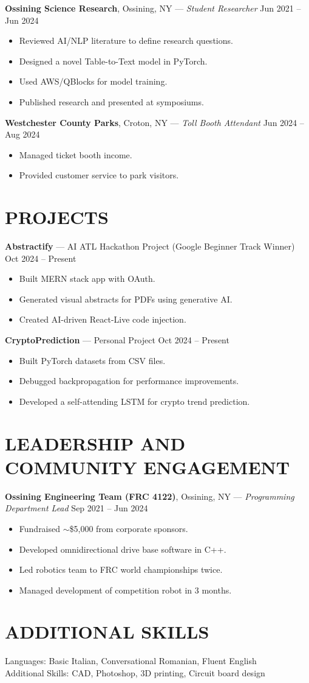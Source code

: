 \documentclass[11pt]{article}
\begin{document}
\textbf{Ossining Science Research}, Ossining, NY --- \textit{Student Researcher} \hfill Jun 2021 -- Jun 2024
\begin{itemize}
    \item Reviewed AI/NLP literature to define research questions.
    \item Designed a novel Table-to-Text model in PyTorch.
    \item Used AWS/QBlocks for model training.
    \item Published research and presented at symposiums.
\end{itemize}

\textbf{Westchester County Parks}, Croton, NY --- \textit{Toll Booth Attendant} \hfill Jun 2024 -- Aug 2024
\begin{itemize}
    \item Managed ticket booth income.
    \item Provided customer service to park visitors.
\end{itemize}

\section*{PROJECTS}
\textbf{Abstractify} --- AI ATL Hackathon Project (Google Beginner Track Winner) \hfill Oct 2024 -- Present
\begin{itemize}
    \item Built MERN stack app with OAuth.
    \item Generated visual abstracts for PDFs using generative AI.
    \item Created AI-driven React-Live code injection.
\end{itemize}

\textbf{CryptoPrediction} --- Personal Project \hfill Oct 2024 -- Present
\begin{itemize}
    \item Built PyTorch datasets from CSV files.
    \item Debugged backpropagation for performance improvements.
    \item Developed a self-attending LSTM for crypto trend prediction.
\end{itemize}

\section*{LEADERSHIP AND COMMUNITY ENGAGEMENT}
\textbf{Ossining Engineering Team (FRC 4122)}, Ossining, NY --- \textit{Programming Department Lead} \hfill Sep 2021 -- Jun 2024
\begin{itemize}
    \item Fundraised $\sim$\$5,000 from corporate sponsors.
    \item Developed omnidirectional drive base software in C++.
    \item Led robotics team to FRC world championships twice.
    \item Managed development of competition robot in 3 months.
\end{itemize}

\section*{ADDITIONAL SKILLS}
Languages: Basic Italian, Conversational Romanian, Fluent English \\
Additional Skills: CAD, Photoshop, 3D printing, Circuit board design
\end{document}

